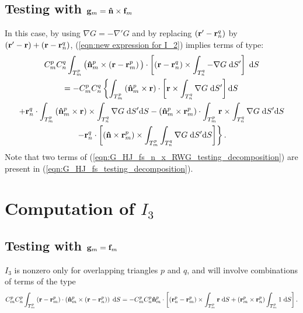 \subsection{Testing with $\mathbf{g}_m = \mathbf{\Hat{n}} \times \mathbf{f}_m$}
%
\par
In this case, by using $\nabla G = -\nabla' G$ and by replacing $\left(\mathbf{r}'-\mathbf{r}_n^q \right)$ by $\left(\mathbf{r}'-\mathbf{r} \right) + \left(\mathbf{r}-\mathbf{r}_n^q \right)$, (\ref{eqn:new expression for I_2}) implies terms of type:
\begin{multline} \label{eqn:G_HJ_fs_n_x_RWG_testing_decomposition}
C_m^p C_n^q \int_{T_m^p} \big( \mathbf{\Hat{n}}_m^p \times \left(\mathbf{r} - \mathbf{r}_m^p \right) \big) \cdot \left[\left(\mathbf{r} - \mathbf{r}_n^q\right) \times \int_{T_n^q} -\nabla G \; \text{d} S'\right] \; \text{d} S \\
= -C_m^p C_n^q \left\{ \int_{T_m^p} \left(\mathbf{\Hat{n}}_m^p \times \mathbf{r}\right) \cdot \left[\mathbf{r} \times \int_{T_n^q} \nabla G \; \text{d} S' \right] \text{d} S \right. \\
+ \mathbf{r}_n^q \cdot \int_{T_m^p} \left(\mathbf{\Hat{n}}_m^p \times \mathbf{r}\right) \times \int_{T_n^q} \nabla G \; \text{d} S' \text{d} S  - \left(\mathbf{\Hat{n}}_m^p\times\mathbf{r}_m^p \right) \cdot \int_{T_m^p} \mathbf{r} \times \int_{T_n^q} \nabla G \; \text{d} S' \text{d} S \\
\left. - \mathbf{r}_n^q \cdot \left[\left(\mathbf{\Hat{n}} \times \mathbf{r}_m^p \right) \times \int_{T_m^p} \int_{T_n^q}\nabla G \; \text{d} S' \text{d} S\right]\right\}.
\end{multline}
Note that two terms of (\ref{eqn:G_HJ_fs_n_x_RWG_testing_decomposition}) are present in (\ref{eqn:G_HJ_fs_testing_decomposition}).

\section{Computation of $I_3$}

\subsection{Testing with $\mathbf{g}_m = \mathbf{f}_m$}
%
\par
$I_3$ is nonzero only for overlapping triangles $p$ and $q$, and will involve combinations of terms of the type
\begin{equation} \label{eqn:MMPIE_J_RWG_testing_diag_term}
C_m^p C_n^p \int_{T_m^p} \left(\mathbf{r}-\mathbf{r}_m^p\right) \cdot \left(\mathbf{\Hat{n}}_m^p \times \left(\mathbf{r}-\mathbf{r}_n^p\right) \right) \; \text{d} S =  - C_m^p C_n^p \mathbf{\Hat{n}}_m^p \cdot \left[\left(\mathbf{r}_n^p-\mathbf{r}_m^p\right) \times \int_{T_m^p} \mathbf{r} \; \text{d} S + \left(\mathbf{r}_m^p \times \mathbf{r}_n^p\right) \int_{T_m^p} 1 \; \text{d} S \right].
\end{equation}


